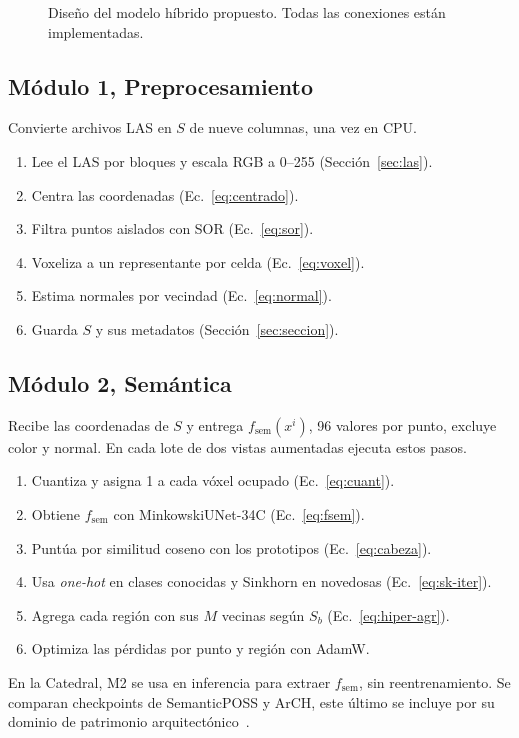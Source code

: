 \begin{figure}[!t]
\centering
{\hypersetup{linkcolor=blue!55!black}\fuentediagrama
{}}
\caption[Diseño del modelo híbrido propuesto]{Diseño del modelo híbrido propuesto. Todas las conexiones están implementadas.}
\label{fig:diseno}
\end{figure}

\subsection{Módulo 1, Preprocesamiento}
\label{sec:modulo1}

Convierte archivos LAS en $S$ de nueve columnas, una vez en CPU.
\begin{enumerate}\setlength{\itemsep}{1pt}
\item Lee el LAS por bloques y escala RGB a 0--255 (Sección~\ref{sec:las}).
\item Centra las coordenadas (Ec.~\eqref{eq:centrado}).
\item Filtra puntos aislados con SOR (Ec.~\eqref{eq:sor}).
\item Voxeliza a un representante por celda (Ec.~\eqref{eq:voxel}).
\item Estima normales por vecindad (Ec.~\eqref{eq:normal}).
\item Guarda $S$ y sus metadatos (Sección~\ref{sec:seccion}).
\end{enumerate}
\subsection{Módulo 2, Semántica}
\label{sec:modulo2}

Recibe las coordenadas de $S$ y entrega $f_{\mathrm{sem}}(x^i)$, 96 valores por punto,
excluye color y normal. En cada lote de dos vistas aumentadas ejecuta estos pasos.
\begin{enumerate}\setlength{\itemsep}{1pt}
\item Cuantiza y asigna 1 a cada vóxel ocupado (Ec.~\ref{eq:cuant}).
\item Obtiene $f_{\mathrm{sem}}$ con MinkowskiUNet-34C (Ec.~\ref{eq:fsem}).
\item Puntúa por similitud coseno con los prototipos (Ec.~\ref{eq:cabeza}).
\item Usa \emph{one-hot} en clases conocidas y Sinkhorn en novedosas (Ec.~\ref{eq:sk-iter}).
\item Agrega cada región con sus $M$ vecinas según $S_b$ (Ec.~\ref{eq:hiper-agr}).
\item Optimiza las pérdidas por punto y región con AdamW.
\end{enumerate}
En la Catedral, M2 se usa en inferencia para extraer $f_{\mathrm{sem}}$, sin
reentrenamiento. Se comparan checkpoints de SemanticPOSS y ArCH, este último se
incluye por su dominio de patrimonio arquitectónico~\cite{matrone2020benchmark}.

